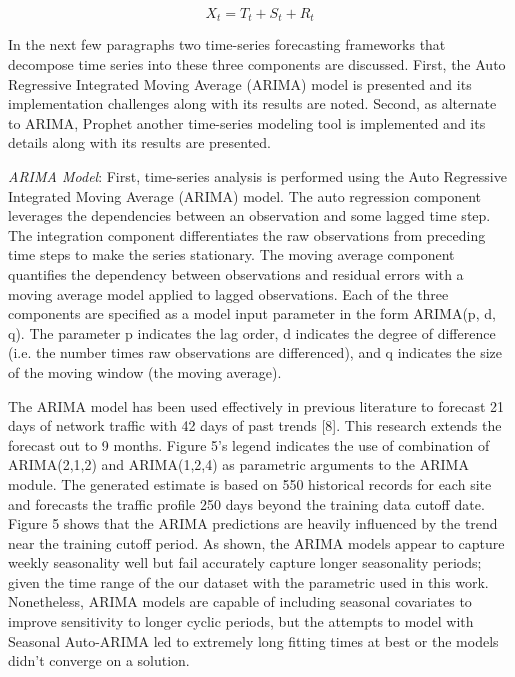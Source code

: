         \begin{equation}
        X_t = T_t + S_t + R_t
        \end{equation}
    
    In the next few paragraphs two time-series forecasting frameworks that decompose time series into these three components are discussed. First, the Auto Regressive Integrated Moving Average (ARIMA) model is presented and its implementation challenges along with its results are noted. Second, as alternate to ARIMA, Prophet another time-series modeling tool is implemented and its details along with its results are presented. 
    
    \emph{ARIMA Model}: First, time-series analysis is performed using the Auto Regressive Integrated Moving Average (ARIMA) model. The auto regression component leverages the dependencies between an observation and some lagged time step. The integration component differentiates the raw observations from preceding time steps to make the series stationary. The moving average component quantifies the dependency between observations and residual errors with a moving average model applied to lagged observations. Each of the three components are specified as a model input parameter in the form ARIMA(p, d, q). The parameter p indicates the lag order, d indicates the degree of difference (i.e. the number times raw observations are differenced), and q indicates the size of the moving window (the moving average). 
    
    The ARIMA model has been used effectively in previous literature to forecast 21 days of network traffic with 42 days of past trends [8]. This research extends the forecast out to 9 months. Figure 5’s legend indicates the use of combination of ARIMA(2,1,2) and ARIMA(1,2,4) as parametric arguments to the ARIMA module. The generated estimate is based on 550 historical records for each site and forecasts the traffic profile 250 days beyond the training data cutoff date. Figure 5 shows that the ARIMA predictions are heavily influenced by the trend near the training cutoff period. As shown, the ARIMA models appear to capture weekly seasonality well but fail accurately capture longer seasonality periods; given the time range of the our dataset with the parametric used in this work. Nonetheless, ARIMA models are capable of including seasonal covariates to improve sensitivity to longer cyclic periods, but the attempts to model with Seasonal Auto-ARIMA led to extremely long fitting times at best or the models didn't converge on a solution. 
    
